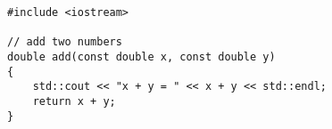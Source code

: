 \documentclass[UTF8]{ctexart}
\begin{document}
\begin{lstlisting}
#include <iostream>

// add two numbers
double add(const double x, const double y)
{
    std::cout << "x + y = " << x + y << std::endl;
    return x + y;
}
\end{lstlisting}
\end{document}
